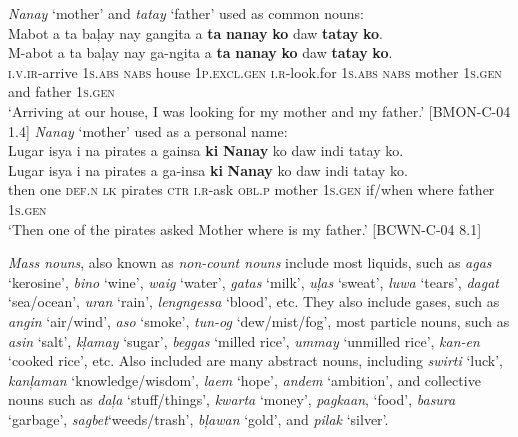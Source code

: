 \ea
\textit{Nanay} ‘mother’ and \textit{tatay} ‘father’ used as common nouns: \\
Mabot  a  ta  baļay  nay  gangita a  \textbf{ta}  \textbf{nanay}  \textbf{ko}  daw  \textbf{tatay}  \textbf{ko}. \\\smallskip
 \gll M-abot  a  ta  baļay  nay  ga-ngita a  \textbf{ta}  \textbf{nanay}  \textbf{ko}  daw  \textbf{tatay}  \textbf{ko}. \\
\textsc{i.v.ir}-arrive  1\textsc{s.abs}  \textsc{nabs}  house  1\textsc{p.excl.gen}  \textsc{i.r}-look.for 1\textsc{s.abs} \textsc{nabs}  mother  1\textsc{s.gen} and  father  1\textsc{s.gen} \\
\glt `Arriving at our house, I was looking for my mother and my father.’ [BMON-C-04 1.4]
\z
\ea
\textit{Nanay} ‘mother’ used as a personal name: \\
Lugar isya  i  na  pirates  a  gainsa  \textbf{ki}  \textbf{Nanay}  ko  daw indi  tatay  ko. \\\smallskip
 \gll Lugar\footnotemark{}  isya  i  na  pirates  a  ga-insa  \textbf{ki}  \textbf{Nanay}  ko  daw indi  tatay  ko. \\
then  one  \textsc{def.n}  \textsc{lk}  pirates  \textsc{ctr}  \textsc{i.r}-ask  \textsc{obl.p} mother  1\textsc{s.gen}  if/when  where  father  1\textsc{s.gen} \\
\glt `Then one of the pirates asked Mother where is my father.’ [BCWN-C-04 8.1]
\z



\textit{Mass nouns}, also known as \textit{non-count nouns} 
include most liquids, such as \textit{agas} ‘kerosine’, \textit{bino} ‘wine’, \textit{waig} ‘water’, \textit{gatas} ‘milk’, \textit{uļas} ‘sweat’, \textit{luwa} ‘tears’, \textit{dagat} ‘sea/ocean’, \textit{uran} ‘rain’, \textit{lengngessa} ‘blood’, etc. They also include gases, such as \textit{angin} ‘air/wind’, \textit{aso} ‘smoke’, \textit{tun-og} ‘dew/mist/fog’, most particle nouns, such as \textit{asin} ‘salt’, \textit{kļamay} ‘sugar’, \textit{beggas} ‘milled rice’, \textit{ummay} ‘unmilled rice’, \textit{kan-en} ‘cooked rice’, etc. Also included are many abstract nouns, including \textit{swirti} ‘luck’, \textit{kanļaman} ‘knowledge/wisdom’, \textit{laem} ‘hope’, \textit{andem} ‘ambition’, and collective nouns such as \textit{daļa} ‘stuff/things’, \textit{kwarta} ‘money’, \textit{pagkaan}, ‘food’, \textit{basura} ‘garbage’, \textit{sagbet}‘weeds/trash’, \textit{bļawan} ‘gold’, and \textit{pilak} ‘silver’.

